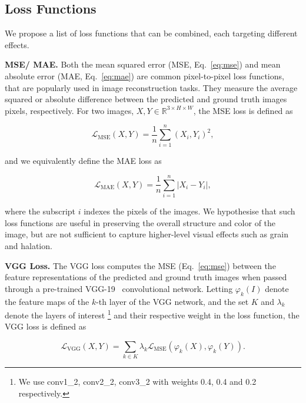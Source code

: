 \subsection{Loss Functions}
\label{subsec:loss-functions}

We propose a list of loss functions that can be combined, each targeting different effects.

\textbf{MSE/ MAE.} Both the mean squared error (MSE, Eq.~\ref{eq:mse}) and mean absolute error (MAE, Eq.~\ref{eq:mae}) are common pixel-to-pixel loss functions, that are popularly used in image reconstruction tasks. They measure the average squared or absolute difference between the predicted and ground truth images pixels, respectively. For two images, $X, Y \in \mathbb{R}^{3 \times H \times W}$, the MSE loss is defined as

\begin{equation}
    \mathcal{L}_\text{MSE}(X, Y) = \frac{1}{n} \sum_{i=1}^{n} (X_i, Y_i)^2,
    \label{eq:mse}
\end{equation}

and we equivalently define the MAE loss as

\begin{equation}
    \mathcal{L}_\text{MAE}(X, Y) = \frac{1}{n} \sum_{i=1}^{n} |X_i - Y_i|,
    \label{eq:mae}
\end{equation}

where the subscript $i$ indexes the pixels of the images. We hypothesise that
such loss functions are useful in preserving the overall structure and color of the image,
but are not sufficient to capture higher-level visual effects such as grain and
halation.

\textbf{VGG Loss.} The VGG loss computes the MSE (Eq.~\ref{eq:mse}) between the feature representations of the predicted and ground truth images when passed through a pre-trained VGG-19~\cite{vgg} convolutional network. Letting $\varphi_k(I)$ denote the feature maps of the $k$-th layer of the VGG network, and the set $K$ and $\lambda_k$ denote the layers of interest \footnote{We use conv1\_2, conv2\_2, conv3\_2 with weights 0.4, 0.4 and 0.2 respectively.} and their respective weight in the loss function, the VGG loss is defined as

\begin{equation}
   \mathcal{L}_\text{VGG}(X, Y) = \sum_{k \in K} \lambda_k \mathcal{L}_\text{MSE}(\varphi_k(X), \varphi_k(Y)).
    \label{eq:vgg}
\end{equation}

